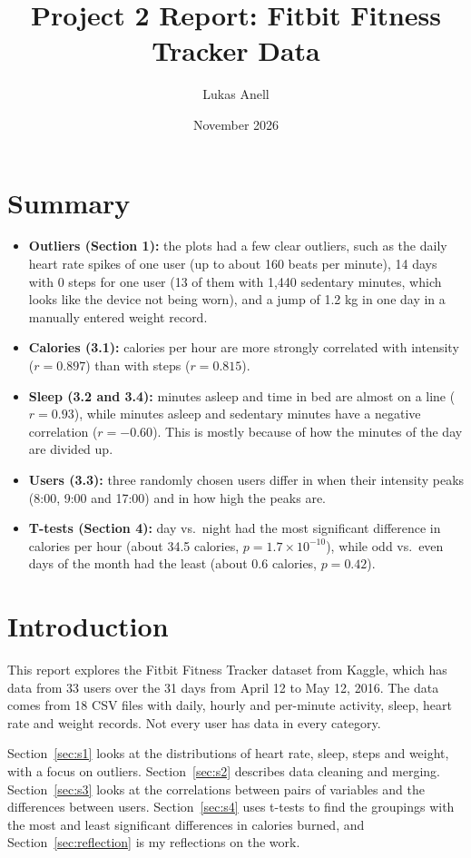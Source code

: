 \documentclass[11pt]{article}
\title{Project 2 Report: Fitbit Fitness Tracker Data}
\author{Lukas Anell}
\date{November 2026}
\begin{document}
\maketitle

\section*{Summary}

\begin{itemize}
	\item \textbf{Outliers (Section 1):} the plots had a few clear outliers, such as the daily heart rate spikes of one user (up to about 160 beats per minute), 14 days with 0 steps for one user (13 of them with 1,440 sedentary minutes, which looks like the device not being worn), and a jump of 1.2 kg in one day in a manually entered weight record.
	\item \textbf{Calories (3.1):} calories per hour are more strongly correlated with intensity ($r = 0.897$) than with steps ($r = 0.815$).
	\item \textbf{Sleep (3.2 and 3.4):} minutes asleep and time in bed are almost on a line ($r = 0.93$), while minutes asleep and sedentary minutes have a negative correlation ($r = -0.60$). This is mostly because of how the minutes of the day are divided up.
	\item \textbf{Users (3.3):} three randomly chosen users differ in when their intensity peaks (8:00, 9:00 and 17:00) and in how high the peaks are.
	\item \textbf{T-tests (Section 4):} day vs.\ night had the most significant difference in calories per hour (about 34.5 calories, $p = 1.7 \times 10^{-10}$), while odd vs.\ even days of the month had the least (about 0.6 calories, $p = 0.42$).
\end{itemize}

\section*{Introduction}

This report explores the Fitbit Fitness Tracker dataset from Kaggle, which has data from 33 users over the 31 days from April 12 to May 12, 2016.
The data comes from 18 CSV files with daily, hourly and per-minute activity, sleep, heart rate and weight records.
Not every user has data in every category.

Section~\ref{sec:s1} looks at the distributions of heart rate, sleep, steps and weight, with a focus on outliers.
Section~\ref{sec:s2} describes data cleaning and merging.
Section~\ref{sec:s3} looks at the correlations between pairs of variables and the differences between users.
Section~\ref{sec:s4} uses t-tests to find the groupings with the most and least significant differences in calories burned, and Section~\ref{sec:reflection} is my reflections on the work.
\end{document}
